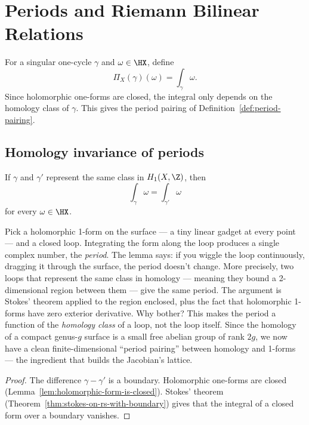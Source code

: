 \section{Periods and Riemann Bilinear Relations}
\label{sec:periods}

For a singular one-cycle \(\gamma\) and \(\omega\in\HX\), define
\[
  \Pi_X(\gamma)(\omega)=\int_{\gamma}\omega.
\]
Since holomorphic one-forms are closed, the integral only depends on the
homology class of \(\gamma\). This gives the period pairing of
Definition~\ref{def:period-pairing}.

\subsection{Homology invariance of periods}

\begin{lemma}
\label{lem:period-homology-invariance}
\notready
If \(\gamma\) and \(\gamma'\) represent the same class in \(H_1(X,\Z)\), then
\[
  \int_{\gamma}\omega=\int_{\gamma'}\omega
\]
for every \(\omega\in\HX\).
\end{lemma}

\begin{layman}
Pick a holomorphic 1-form on the surface — a tiny linear gadget at every
point — and a closed loop. Integrating the form along the loop produces a
single complex number, the \emph{period}. The lemma says: if you wiggle
the loop continuously, dragging it through the surface, the period
doesn't change. More precisely, two loops that represent the same class
in homology — meaning they bound a 2-dimensional region between them —
give the same period. The argument is Stokes' theorem applied to the
region enclosed, plus the fact that holomorphic 1-forms have zero
exterior derivative. Why bother? This makes the period a function of the
\emph{homology class} of a loop, not the loop itself. Since the homology
of a compact genus-\(g\) surface is a small free abelian group of rank
\(2g\), we now have a clean finite-dimensional ``period pairing''
between homology and 1-forms — the ingredient that builds the Jacobian's
lattice.
\end{layman}

\begin{proof}
The difference \(\gamma-\gamma'\) is a boundary. Holomorphic one-forms are
closed (Lemma~\ref{lem:holomorphic-form-is-closed}). Stokes' theorem
(Theorem~\ref{thm:stokes-on-rs-with-boundary}) gives that the integral of
a closed form over a boundary vanishes.
\end{proof}


